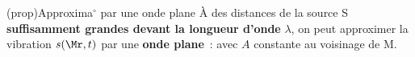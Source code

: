 \documentclass[../../main/main.tex]{subfiles}
\begin{document}
\begin{tcb*}[sidebyside, righthand ratio=.4](prop){Approxima$^\circ$ par une onde
			plane}
	À des distances de la source S \textbf{suffisamment grandes devant la longueur
		d'onde} $\lambda$, on peut approximer la vibration $s(\Mr,t)$ par une
	\textbf{onde plane}~:
	\psw{%
		\[\boxed{s(\Mr,t) = A\cos(\wt-k\SMr +\f_0)}\]
	}%
	avec $A$ constante au voisinage de M.
	\tcblower
	\begin{center}
		\vspace{-15pt}
		\captionsetup{justification=centering}
	\end{center}
\end{tcb*}
\end{document}
